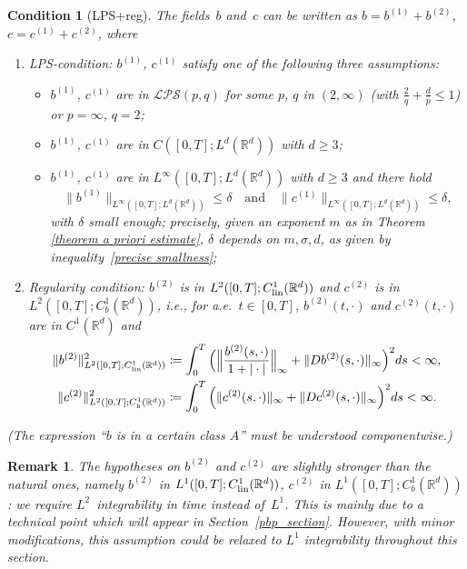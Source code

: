 \documentclass[a4paper,10pt]{article}
\newtheorem{condition}[theorem]{Condition}
\newtheorem{remark}[theorem]{Remark}
\newcommand\1{\mathbbm{1}}
\newcommand\lin{{\rm lin}}
\numberwithin{equation}{section}
\begin{document}
\begin{condition}[LPS+reg]
\label{LPSreg}
The fields~$b$ and~$c$ can be written as $b=b^{(1)}+b^{(2)}$, $c=c^{(1)}+c^{(2)}$, where 
\begin{enumerate}[font=\normalfont]
\item \emph{LPS-condition:} $b^{(1)}$, $c^{(1)}$ satisfy one of the following three assumptions:
 \begin{itemize}[font=\normalfont]
   \item[a)] $b^{(1)}$, $c^{(1)}$ are in $\mathcal{LPS}(p,q)$ for some $p$, $q$ in
$(2,\infty)$ \textup{(}with $\frac2q+\frac{d}{p}\le1$\textup{)} or $p=\infty$, $q=2$;
   \item[b)] $b^{(1)}$, $c^{(1)}$ are in $C([0,T];L^{d}(\mathbb{R}^{d}))$ with $d \geq 3$;
   \item[c)] $b^{(1)}$, $c^{(1)}$ are in $L^{\infty}([0,T];L^{d}(\mathbb{R}^{d}))$
with $d \geq 3$ and there hold
\[
\|b^{(1)}\|_{L^{\infty}([0,T];L^{d}(\mathbb{R}^{d}))}\le\delta \quad \text{and} \quad
\|c^{(1)}\|_{L^{\infty}([0,T];L^{d}(\mathbb{R}^{d}))} \le\delta,
\]
with $\delta$ small enough; precisely, given an exponent $m$ as in Theorem
\ref{theorem a priori estimate}, $\delta$ depends on $m,\sigma,d$, as given by
inequality~\eqref{precise smallness};
 \end{itemize}
   
\item \emph{Regularity condition:} $b^{(2)}$ is in $L^{2}([0,T];C^{1}_{\lin}(\mathbb{R}^{d}))$ and $c^{(2)}$
is in $L^{2}([0,T];C^{1}_{b}(\mathbb{R}^{d}))$, i.e., for a.e.~$t \in [0,T]$,
$b^{(2)}(t,\cdot)$ and $c^{(2)}(t,\cdot)$ are in $C^{1}(\mathbb{R}^{d})$ and
\begin{align*}
\|b^{(2)}\|_{L^{2}([0,T];C^{1}_{\lin}(\mathbb{R}^{d}))}^2 & \coloneqq \int^{T}_{0}\Big(
\Big\| \frac{b^{(2)}(s,\cdot)}{1+|\cdot|}\Big\|_{\infty}+\|Db^{(2)} 
(s,\cdot)\|_{\infty}\Big)^2 ds<\infty,\\
\|c^{(2)}\|_{L^{2}([0,T];C^{1}_{b}(\mathbb{R}^{d}))}^2 & \coloneqq \int^{T}_{0}\Big(
\|c^{(2)}(s,\cdot)\|_{\infty}+\|Dc^{(2)}(s,\cdot)\|_{\infty}\Big)^2 ds<\infty .
\end{align*}
\end{enumerate}
\textup{(}The expression ``$b$ is in a certain class $A$'' must be understood componentwise.\textup{)}
\end{condition}

\begin{remark}\label{L2time}
The hypotheses on $b^{(2)}$ and $c^{(2)}$ are slightly stronger than the natural ones, namely $b^{(2)}$ in $L^{1}([0,T];C^{1}_{\lin}(\mathbb{R}^{d}))$, $c^{(2)}$ in $L^{1}([0,T];C^{1}_{b}(\mathbb{R}^{d}))$: we require $L^2$~integrability in time instead of~$L^1$. This is mainly due to a technical point which will appear in Section~\ref{pbp_section}. However, with minor modifications, this assumption could be relaxed to $L^1$ integrability throughout this section.
\end{remark}
\end{document}
